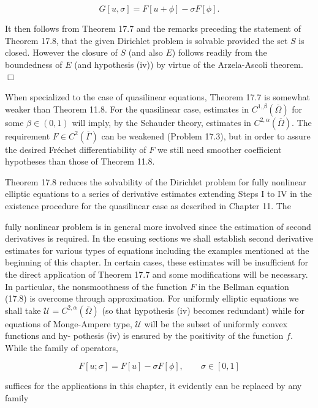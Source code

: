 \[
G[u,\sigma]=F[u+\phi]-\sigma F[\phi].
\]

It then follows from Theorem 17.7 and the remarks preceding the statement of
Theorem 17.8, that the given Dirichlet problem is solvable provided the set $S$ is
closed. However the closure of $S$ (and also $E$) follows readily from the boundedness
of $E$ (and hypothesis (iv)) by virtue of the Arzela-Ascoli theorem. $\Box$

\medskip

When specialized to the case of quasilinear equations, Theorem 17.7 is somewhat weaker than Theorem 11.8. For the quasilinear case, estimates in $C^{1,\beta}(\overline{\Omega})$ for
some $\beta\in(0,1)$ will imply, by the Schauder theory, estimates in $C^{2,\alpha}(\overline{\Omega})$. The requirement $F\in C^2(\overline{\Gamma})$ can be weakened (Problem 17.3), but in order to assure the desired Fr\'echet differentiability of $F$ we still need smoother coefficient hypotheses than those of Theorem 11.8.

Theorem 17.8 reduces the solvability of the Dirichlet problem for fully nonlinear elliptic equations to a series of derivative estimates extending Steps I to IV in the existence procedure for the quasilinear case as described in Chapter 11. The



\pagestyle{empty}


fully nonlinear problem is in general more involved since the estimation of second
derivatives is required. In the ensuing sections we shall establish second derivative
estimates for various types of equations including the examples mentioned at the
beginning of this chapter. In certain cases, these estimates will be insufficient for the
direct application of Theorem 17.7 and some modifications will be necessary. In
particular, the nonsmoothness of the function $F$ in the Bellman equation (17.8) is
overcome through approximation. For uniformly elliptic equations we shall take
$\mathcal{U} = C^{2,\alpha}(\bar{\Omega})$ (so that hypothesis (iv) becomes redundant) while for equations of
Monge-Ampere type, $\mathcal{U}$ will be the subset of uniformly convex functions and hy-
pothesis (iv) is ensured by the positivity of the function $f$. While the family of
operators,

\[
F[u; \sigma] = F[u] - \sigma F[\phi], \qquad \sigma \in [0,1]
\]

suffices for the applications in this chapter, it evidently can be replaced by any
family

